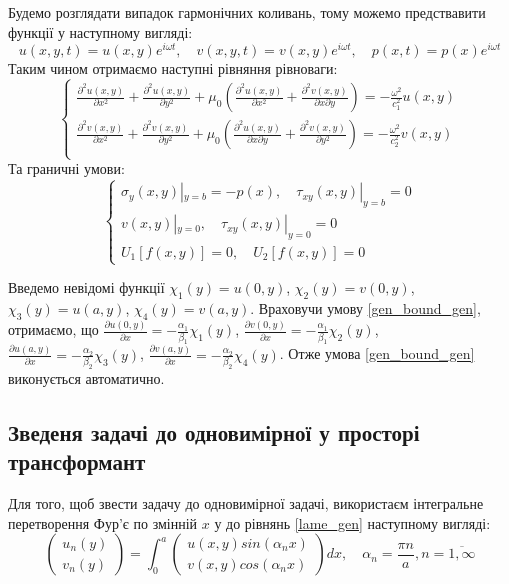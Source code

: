 Будемо розглядати випадок гармонічних коливань, тому можемо предствавити функції у наступному вигляді:
\begin{equation}
    u(x,y,t) = u(x,y) e^{i \omega t}, \quad v(x,y,t) = v(x,y) e^{i \omega t}, \quad p(x,t) = p(x) e^{i \omega t}
\end{equation}
Таким чином отримаємо наступні рівняння рівноваги:
\begin{equation}\label{lame_gen}
    \begin{cases}
        \frac{\partial^2 u(x,y)}{\partial x^2} + \frac{\partial^2 u(x,y)}{\partial y^2} + \mu_0 (\frac{\partial^2 u(x,y)}{\partial x^2} + \frac{\partial^2 v(x,y)}{\partial x\partial y}) = -\frac{\omega^2}{c_1^2}  u(x,y) \\
        \frac{\partial^2 v(x,y)}{\partial x^2} + \frac{\partial^2 v(x,y)}{\partial y^2} + \mu_0 (\frac{\partial^2 u(x,y)}{\partial x \partial y} + \frac{\partial^2 v(x,y)}{\partial y^2}) = -\frac{\omega^2}{c_2^2} v(x,y) \\
    \end{cases}
\end{equation}
Та граничні умови:
\begin{equation}\label{bound_gen}
    \begin{cases}
        \sigma_y(x, y) |_{y=b} = -p(x), \quad  \tau_{xy}(x,y) |_{y=b} =0 \\
        v(x,y) |_{y=0}, \quad \tau_{xy}(x,y) |_{y=0} =0 \\
        U_1[f(x,y)]=0, \quad U_2[f(x,y)]=0
    \end{cases}
\end{equation}

Введемо невідомі функції $\chi_1(y) = u(0, y)$, $\chi_2(y) = v(0, y)$, $\chi_3(y) = u(a, y)$, $\chi_4(y) = v(a, y)$.
Враховучи умову \eqref{gen_bound_gen}, отримаємо, що 
$\frac{\partial u(0, y)}{\partial x}=-\frac{\alpha_1}{\beta_1} \chi_1(y)$,
$\frac{\partial v(0, y)}{\partial x}=-\frac{\alpha_1}{\beta_1} \chi_2(y)$,
$\frac{\partial u(a, y)}{\partial x}=-\frac{\alpha_2}{\beta_2} \chi_3(y)$,
$\frac{\partial v(a, y)}{\partial x}=-\frac{\alpha_2}{\beta_2} \chi_4(y)$.
Отже умова \eqref{gen_bound_gen} виконується автоматично.

\subsection{Зведеня задачі до одновимірної у просторі трансформант}
Для того, щоб звести задачу до одновимірної задачі, використаєм інтегральне перетворення Фур'є по змінній $x$ у до рівнянь \eqref{lame_gen} наступному вигляді:
\begin{equation}
    \begin{pmatrix}
        u_n(y) \\
        v_n(y)
    \end{pmatrix} = \int_{0}^{a} 
    \begin{pmatrix}
        u(x,y) sin(\alpha_n x) \\
        v(x,y) cos(\alpha_n x)
    \end{pmatrix} dx, \quad \alpha_n = \frac{\pi n}{a}, n=\overline{1, \infty}
\end{equation}

